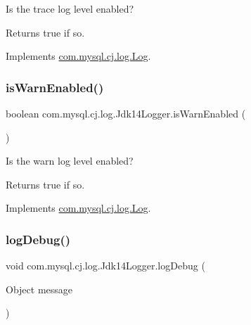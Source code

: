 Is the \textquotesingle{}trace\textquotesingle{} log level enabled?

\begin{DoxyReturn}{Returns}
true if so. 
\end{DoxyReturn}


Implements \mbox{\hyperlink{interfacecom_1_1mysql_1_1cj_1_1log_1_1_log_a814070e176d987da656b45662bc63ccd}{com.\+mysql.\+cj.\+log.\+Log}}.

\mbox{\label{classcom_1_1mysql_1_1cj_1_1log_1_1_jdk14_logger_a878077a85d6821f2b7ba2eca93e9e01d}} 
\subsubsection{\texorpdfstring{is\+Warn\+Enabled()}{isWarnEnabled()}}
{\footnotesize\ttfamily boolean com.\+mysql.\+cj.\+log.\+Jdk14\+Logger.\+is\+Warn\+Enabled (\begin{DoxyParamCaption}{ }\end{DoxyParamCaption})}

Is the \textquotesingle{}warn\textquotesingle{} log level enabled?

\begin{DoxyReturn}{Returns}
true if so. 
\end{DoxyReturn}


Implements \mbox{\hyperlink{interfacecom_1_1mysql_1_1cj_1_1log_1_1_log_a7877db04f22a78b801a8f2f8989d7043}{com.\+mysql.\+cj.\+log.\+Log}}.

\mbox{\label{classcom_1_1mysql_1_1cj_1_1log_1_1_jdk14_logger_a9675c51be991227aaa6d395fb618eef2}} 
\subsubsection{\texorpdfstring{log\+Debug()}{logDebug()}\hspace{0.1cm}{\footnotesize\ttfamily [1/2]}}
{\footnotesize\ttfamily void com.\+mysql.\+cj.\+log.\+Jdk14\+Logger.\+log\+Debug (\begin{DoxyParamCaption}\item[{Object}]{message }\end{DoxyParamCaption})}

